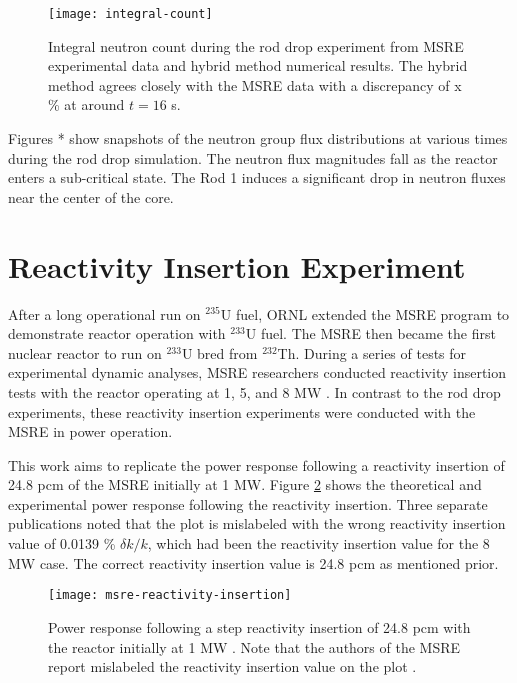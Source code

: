 \begin{figure}[t]
  \centering
  \texttt{[image: integral-count]}
  \caption{Integral neutron count during the rod drop experiment from \gls{MSRE} experimental data
  and hybrid method numerical results. The hybrid method agrees closely with the \gls{MSRE} data
  with a discrepancy of x \% at around $t=16$ s.}
  \label{fig:integral-count}
\end{figure}

Figures * show snapshots of the neutron group flux distributions at various times during the rod
drop simulation. The neutron flux magnitudes fall as the reactor enters a sub-critical state. The
Rod 1 induces a significant drop in neutron fluxes near the center of the core.

\section{Reactivity Insertion Experiment} \label{sec:reactivity-insertion}

After a long operational run on $^{235}$U fuel, \gls{ORNL} extended the \gls{MSRE} program to
demonstrate reactor operation with $^{233}$U fuel. The \gls{MSRE} then became the first nuclear
reactor to run on $^{233}$U bred from $^{232}$Th. During a series of tests for experimental
dynamic analyses, \gls{MSRE} researchers conducted reactivity insertion tests with the reactor
operating at 1, 5, and 8 MW \cite{steffy_experimental_1970}.
In contrast to the rod drop experiments, these reactivity insertion
experiments were conducted with the \gls{MSRE} in power operation.

This work aims to replicate the power response following a reactivity insertion of 24.8 pcm of the
\gls{MSRE} initially at 1 MW. Figure \ref{fig:msre-reactivity-insertion} shows the theoretical and
experimental power response following the reactivity insertion. Three separate publications
\cite{zanetti_innovative_2015, singh_study_2019, mochizuki_validation_2022} noted that the plot is
mislabeled with the wrong reactivity insertion value of 0.0139 \% $\delta k/k$, which had been the
reactivity insertion value for the 8 MW case. The correct reactivity insertion value is 24.8 pcm as
mentioned prior.

\begin{figure}[t]
  \centering
  \texttt{[image: msre-reactivity-insertion]}
  \caption{Power response following a step reactivity insertion of 24.8 pcm with the reactor
    initially at 1 MW \cite{steffy_experimental_1970}. Note that the authors of the \gls{MSRE}
    report mislabeled the reactivity insertion value on the plot
  \cite{zanetti_innovative_2015, singh_study_2019, mochizuki_validation_2022}.}
  \label{fig:msre-reactivity-insertion}
\end{figure}

